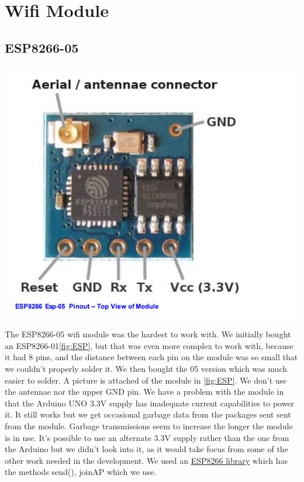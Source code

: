 \documentclass[a4paper,12pt,twoside,openright,titlepage]{book}
\begin{document}
\section{Wifi Module}
\subsection{ESP8266-05}
\begin{center}
	\includegraphics[scale=0.3]{ESP8266}
\end{center}

The ESP8266-05 wifi module was the hardest to work with. We initially bought an ESP8266-01\ref{fig:ESP}, but that was even more complex to work with, because it had 8 pins, and the distance between each pin on the module was so small that we couldn't properly solder it. We then bought the 05 version which was much easier to solder. A picture is attached of the module in \ref{fig:ESP}. We don't use the antennae nor the upper GND pin. We have a problem with the module in that the Arduino UNO 3.3V supply has inadequate current capabilities to power it. It still works but we get occasional garbage data from the packages sent sent from the module. Garbage transmissions seem to increase the longer the module is in use. It's possible to use an alternate 3.3V supply rather than the one from the Arduino but we didn't look into it, as it would take focus from some of the other work needed in the development. We used an \href{https://github.com/Hergeirs/Arduino2/blob/master/FWG7RQ3IRXT1DFL/ESP8266.h}{ESP8266 library} which  has the methods send(), joinAP which we use.
\end{document}
